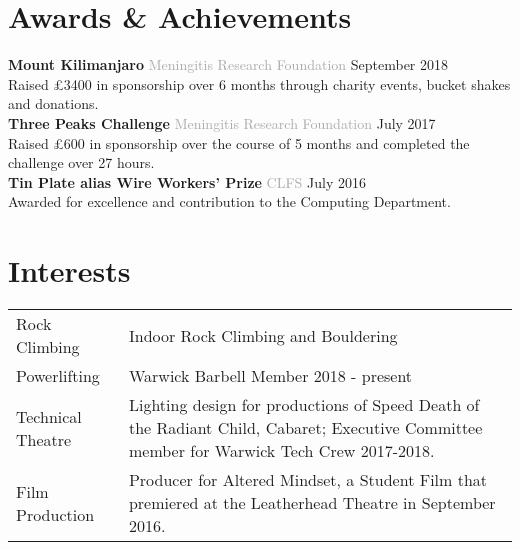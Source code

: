 \documentclass[11pt]{article}
\newcommand{\linesep}{\noindent\makebox[\linewidth]{\rule{\linewidth}{0.2pt}}}
\begin{document}
  \section*{Awards \& Achievements}
\textbf{Mount Kilimanjaro} \hfill \hspace{4em} \textcolor{darkgray}{Meningitis Research Foundation} \hfill September 2018 \\
\hspace*{2em} Raised £3400 in sponsorship over 6 months through charity events, bucket shakes and  donations.
\vspace{1ex}\\
\textbf{Three Peaks Challenge} \hfill \textcolor{darkgray}{Meningitis Research Foundation} \hfill July 2017 \\
\hspace*{2em} Raised £600 in sponsorship over the course of 5 months and completed the challenge over 27 hours.
\vspace{1ex}\\
\textbf{Tin Plate alias Wire Workers’ Prize} \hfill \hspace{-17em} \textcolor{darkgray}{CLFS} \hfill July 2016 \\
\hspace*{2em} Awarded for excellence and contribution to the Computing Department.

  \linesep

  \section*{Interests}
   \begin{center}
    \begin{tabularx}{\linewidth}{ X X }
Rock Climbing & Indoor Rock Climbing and Bouldering \\
Powerlifting & Warwick Barbell Member 2018 - present \\
Technical Theatre & Lighting design for productions of Speed Death of the Radiant
Child, Cabaret; Executive Committee member for Warwick Tech Crew 2017-2018.\\
Film Production & Producer for Altered Mindset, a Student Film that premiered at 
the Leatherhead Theatre in September 2016.
    \end{tabularx}
   \end{center}

  \linesep

\titlespacing*{\section}{5pt}{2pt}{3pt}
\end{document}
